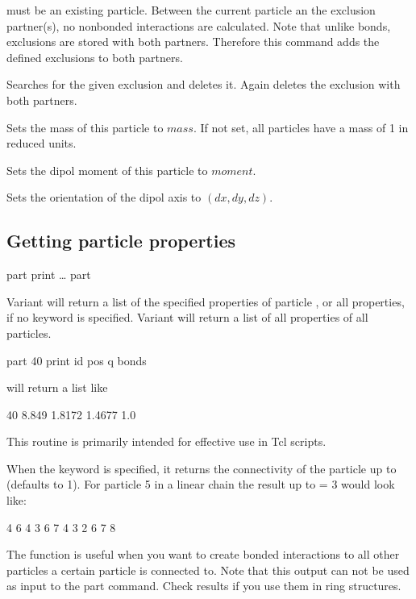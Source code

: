 \begin{arguments}
   must be an existing particle.  Between the
  current particle an the exclusion partner(s), no nonbonded
  interactions are calculated. Note that unlike bonds, exclusions are
  stored with both partners.  Therefore this command adds the defined
  exclusions to both partners.
\item[\opt{exclude delete \var{exclusion_partner}+}] Searches for the
  given exclusion and deletes it. Again deletes the exclusion with
  both partners.
  \item[\opt{mass \var{mass}}] Sets the mass of this particle to $mass$. If not
  set, all particles have a mass of 1 in reduced units.
  \item[\opt{dipm \var{moment}}] Sets the dipol moment of this particle to $moment$.
  \item[\opt{dip \var{dx} \var{dy} \var{dz}}] Sets the orientation of the
  dipol axis to $(dx,dy,dz)$.
 
  \end{arguments}
\subsection{Getting particle properties}

\begin{essyntax}
  part  print
  \dots
   part
\end{essyntax}

Variant  will return a list of the specified properties of
particle , or all properties, if no keyword is
specified.  Variant  will return a list of all properties
of all particles.

\begin{code}
part 40 print id pos q bonds
\end{code}
will return a list like
\begin{tclcode}
40 8.849 1.8172 1.4677 1.0 {}
\end{tclcode}
This routine is primarily intended for effective use in Tcl scripts.

When the keyword  is specified, it returns the
connectivity of the particle up to  (defaults to 1). For
particle 5 in a linear chain the result up to  = 3 would
look like:
\begin{tclcode}
{ { 4 } { 6 } } { { 4 3 } { 6 7 } } { {4 3 2 } { 6 7 8 } } 
\end{tclcode}
The function is useful when you want to create bonded interactions to
all other particles a certain particle is connected to. Note that this
output can not be used as input to the part command. Check results if
you use them in ring structures.

